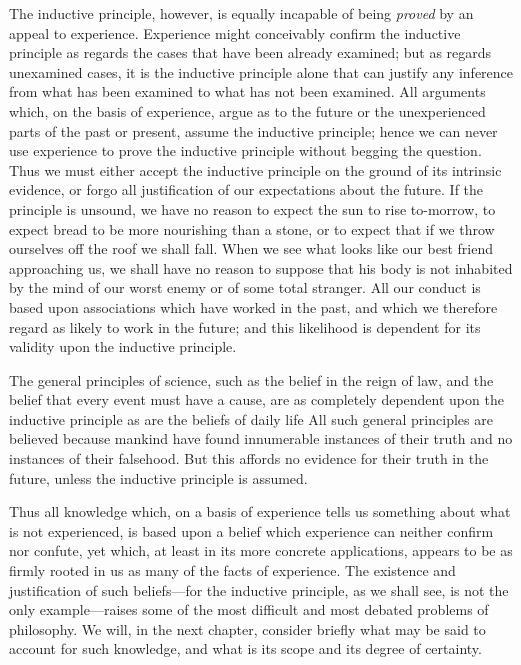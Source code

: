 \documentclass[oneside,letterpaper,12pt]{book}
\begin{document}
The inductive principle, however, is equally incapable of being
\emph{proved} by an appeal to experience. Experience might conceivably
confirm the inductive principle as regards the cases that have been
already examined; but as regards unexamined cases, it is the inductive
principle alone that can justify any inference from what has been
examined to what has not been examined. All arguments which, on the
basis of experience, argue as to the future or the unexperienced parts
of the past or present, assume the inductive principle; hence we can
never use experience to prove the inductive principle without begging
the question. Thus we must either accept the inductive principle on the
ground of its intrinsic evidence, or forgo all justification of our
expectations about the future. If the principle is unsound, we have no
reason to expect the sun to rise to-morrow, to expect bread to be more
nourishing than a stone, or to expect that if we throw ourselves off the
roof we shall fall. When we see what looks like our best friend
approaching us, we shall have no reason to suppose that his body is not
inhabited by the mind of our worst enemy or of some total stranger. All
our conduct is based upon associations which have worked in the past,
and which we therefore regard as likely to work in the future; and this
likelihood is dependent for its validity upon the inductive principle.

The general principles of science, such as the belief in the reign of
law, and the belief that every event must have a cause, are as
completely dependent upon the inductive principle as are the beliefs of
daily life All such general principles are believed because mankind have
found innumerable instances of their truth and no instances of their
falsehood. But this affords no evidence for their truth in the future,
unless the inductive principle is assumed.

Thus all knowledge which, on a basis of experience tells us something
about what is not experienced, is based upon a belief which experience
can neither confirm nor confute, yet which, at least in its more
concrete applications, appears to be as firmly rooted in us as many of
the facts of experience. The existence and justification of such
beliefs---for the inductive principle, as we shall see, is not the only
example---raises some of the most difficult and most debated problems of
philosophy. We will, in the next chapter, consider briefly what may be
said to account for such knowledge, and what is its scope and its degree
of certainty.
\end{document}
